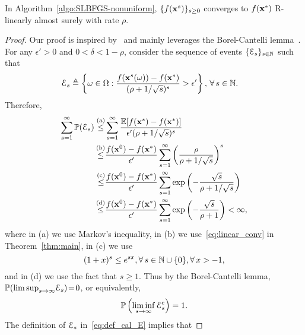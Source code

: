\documentclass[10pt,twocolumn,journal]{IEEEtran}
\newcommand\red[1]{\textcolor{red}{#1}}
\begin{document}
\begin{corollary}\label{cor:as_conv}
In Algorithm~\ref{algo:SLBFGS-nonuniform}, $\{f(\mathbf{x}^s)\}_{s\ge 0}$ converges to $f(\mathbf{x}^*)$ R-linearly almost surely with rate $\rho$. %
\end{corollary}

\begin{proof}
Our proof is inspired by~\cite[Corollary~2]{Goldfarb_17} and  mainly  
leverages  the Borel-Cantelli lemma~\cite{Will_91}. 
For any $\epsilon'>0$ and $0\!<\!\delta\!<\!1-\rho$, consider the sequence of events %
$\{\mathcal{E}_s\}_{s\in\mathbb{N}}$ such that
\begin{align}
\mathcal{E}_s&\triangleq\left\{\omega\in\Omega:\frac{f(\mathbf{x}^s(\omega))-f(\mathbf{x}^*)}{(\rho+1/\sqrt{s})^s}>\epsilon'\right\}, \,\forall\,s\in\mathbb{N}. \label{eq:def_cal_E}
\end{align}
Therefore, 
\begin{align}
\sum_{s=1}^\infty \mathbb{P}(\mathcal{E}_s) \stackrel{\rm(a)}{\le} &\sum_{s=1}^\infty \frac{\mathbb{E}[f(\mathbf{x}^s)-f(\mathbf{x}^*)]}{\epsilon'(\rho+1/\sqrt{s})^s}\nonumber\\
\stackrel{\rm(b)}{\le} &\frac{f(\mathbf{x}^0)-f(\mathbf{x}^*)}{\epsilon'}\sum_{s=1}^\infty \left(\frac{\rho}{\rho+1/\sqrt{s}}\right)^s \nonumber\\
\stackrel{\rm(c)}{\le} &  \frac{f(\mathbf{x}^0)-f(\mathbf{x}^*)}{\epsilon'}\sum_{s=1}^\infty \exp\left(-\frac{\sqrt{s}}{\rho+1/\sqrt{s}}\right)\nonumber\\
\stackrel{\rm(d)}{\le} & \frac{f(\mathbf{x}^0)-f(\mathbf{x}^*)}{\epsilon'}\sum_{s=1}^\infty \exp\left(-\frac{\sqrt{s}}{\rho+1}\right) < \infty, \label{eq:finite_sum_prob}
\end{align}
where in (a) we use Markov's inequality, in (b) we use~\eqref{eq:linear_conv} in Theorem~\ref{thm:main}, in (c) we use  
\begin{equation}
(1+x)^s\le e^{sx}, \forall\,s\in \mathbb{N}\cup\{0\}, \forall\, x>-1, \label{eq:lin_exp_ineq}
\end{equation}
and in (d) we use the fact that $s\ge 1$. 
Thus by the Borel-Cantelli lemma, ${\mathbb{P}}(\limsup_{s\to\infty}\!\mathcal{E}_s)\!=\!0$, or equivalently, 
\begin{equation}
\mathbb{P}\left(\liminf_{s\to\infty}\mathcal{E}_s^{\mathrm{c}}\right)=1.
\end{equation}
The definition of $\mathcal{E}_s$ in~\eqref{eq:def_cal_E} implies that %

\end{proof}
\end{document}
